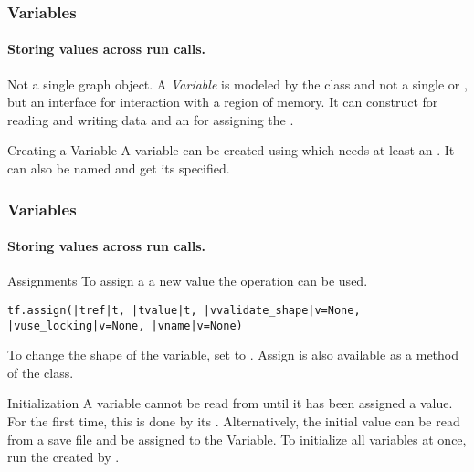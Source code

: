 \begin{frame}
    \frametitle{Variables}
    \framesubtitle{Storing values across run calls.}
    \begin{block}{Not a single graph object.}
        A \emph{Variable} is modeled by the  class and not a single  or , 
        but an interface for interaction with a region of memory. It can construct  for
        reading and writing data and an for assigning the .
    \end{block}
    \begin{block}{Creating a Variable}
        A variable can be created using  which needs at least an .
        It can also be named and get its  specified. 
    \end{block}
\end{frame}

\begin{frame}[fragile]
    \frametitle{Variables}
    \framesubtitle{Storing values across run calls.}
    \begin{block}{Assignments}
        To assign a a new value the  operation can be used. 
        \begin{lstlisting}
tf.assign(|tref|t, |tvalue|t, |vvalidate_shape|v=None, |vuse_locking|v=None, |vname|v=None)
        \end{lstlisting}
        To change the shape of the variable, set  to . Assign is also available as a method of the 
         class.
    \end{block}
    \begin{block}{Initialization}
        A variable cannot be read from until it has been assigned a value. For the first time, this is done 
        by its . Alternatively, the initial value can be read from a save file and
        be assigned to the Variable. To initialize all variables at once, run the  created 
        by .
    \end{block}
\end{frame}

